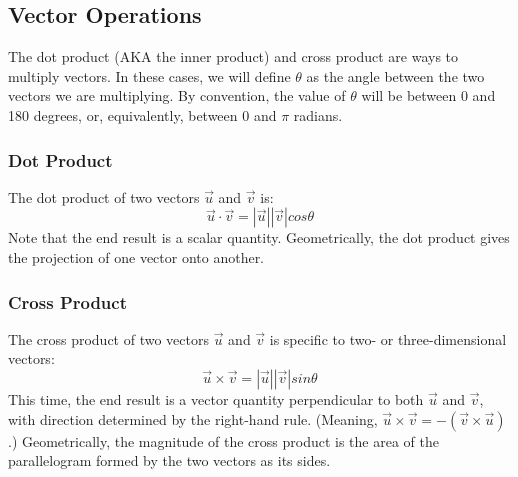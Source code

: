 \documentclass{article}
\begin{document}
\subsection{Vector Operations}
The dot product (AKA the inner product) and cross product are ways to multiply vectors. In these cases, we will define $\theta$ as the angle between the two vectors we are multiplying. By convention, the value of $\theta$ will be between 0 and 180 degrees, or, equivalently, between 0 and $\pi$ radians.
\subsubsection{Dot Product}
The dot product of two vectors $\vec u$ and $\vec v$ is: 
\begin{equation}
 \vec u \cdot \vec v = |\vec u||\vec v|cos\theta
\end{equation}
Note that the end result is a scalar quantity. Geometrically, the dot product gives the projection of one vector onto another.

\begin{center}
\end{center}

\subsubsection{Cross Product}
The cross product of two vectors $\vec u$ and $\vec v$ is specific to two- or three-dimensional vectors:
\begin{equation}
 \vec u \times \vec v = |\vec u||\vec v|sin\theta
\end{equation}
This time, the end result is a vector quantity perpendicular to both $\vec u$ and $\vec v$, with direction determined by the right-hand rule. (Meaning, $\vec u \times \vec v = -(\vec v \times \vec u)$.) Geometrically, the magnitude of the cross product is the area of the parallelogram formed by the two vectors as its sides.
\end{document}
